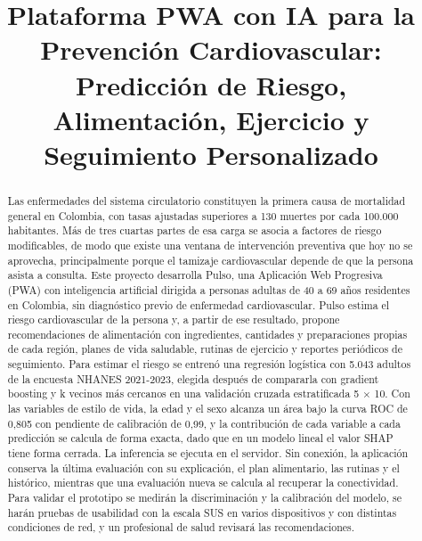 \documentclass[conference]{IEEEtran}
\begin{document}
\title{Plataforma PWA con IA para la Prevención Cardiovascular: Predicción de Riesgo, Alimentación, Ejercicio y Seguimiento Personalizado}
\author{}
\maketitle
\thispagestyle{usb}
\pagestyle{usb}
\begin{abstract}
Las enfermedades del sistema circulatorio constituyen la primera causa de mortalidad general en Colombia, con tasas ajustadas superiores a 130 muertes por cada 100.000 habitantes. Más de tres cuartas partes de esa carga se asocia a factores de riesgo modificables, de modo que existe una ventana de intervención preventiva que hoy no se aprovecha, principalmente porque el tamizaje cardiovascular depende de que la persona asista a consulta. Este proyecto desarrolla Pulso, una Aplicación Web Progresiva (PWA) con inteligencia artificial dirigida a personas adultas de 40 a 69 años residentes en Colombia, sin diagnóstico previo de enfermedad cardiovascular. Pulso estima el riesgo cardiovascular de la persona y, a partir de ese resultado, propone recomendaciones de alimentación con ingredientes, cantidades y preparaciones propias de cada región, planes de vida saludable, rutinas de ejercicio y reportes periódicos de seguimiento. Para estimar el riesgo se entrenó una regresión logística con 5.043 adultos de la encuesta NHANES 2021-2023, elegida después de compararla con gradient boosting y k vecinos más cercanos en una validación cruzada estratificada 5 $\times$ 10. Con las variables de estilo de vida, la edad y el sexo alcanza un área bajo la curva ROC de 0{,}805 con pendiente de calibración de 0{,}99, y la contribución de cada variable a cada predicción se calcula de forma exacta, dado que en un modelo lineal el valor SHAP tiene forma cerrada. La inferencia se ejecuta en el servidor. Sin conexión, la aplicación conserva la última evaluación con su explicación, el plan alimentario, las rutinas y el histórico, mientras que una evaluación nueva se calcula al recuperar la conectividad. Para validar el prototipo se medirán la discriminación y la calibración del modelo, se harán pruebas de usabilidad con la escala SUS en varios dispositivos y con distintas condiciones de red, y un profesional de salud revisará las recomendaciones.
\end{abstract}
\end{document}
